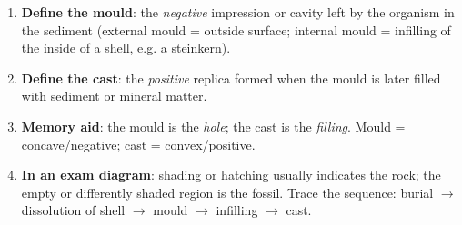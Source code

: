 \documentclass[11pt]{article}
\begin{document}
\begin{methode}
\begin{enumerate}
\item \textbf{Define the mould}: the \emph{negative} impression or cavity left by the organism in the sediment (external mould = outside surface; internal mould = infilling of the inside of a shell, e.g. a steinkern).
\item \textbf{Define the cast}: the \emph{positive} replica formed when the mould is later filled with sediment or mineral matter.
\item \textbf{Memory aid}: the mould is the \emph{hole}; the cast is the \emph{filling}. Mould = concave/negative; cast = convex/positive.
\item \textbf{In an exam diagram}: shading or hatching usually indicates the rock; the empty or differently shaded region is the fossil. Trace the sequence: burial $\rightarrow$ dissolution of shell $\rightarrow$ mould $\rightarrow$ infilling $\rightarrow$ cast.
\end{enumerate}
\end{methode}
\end{document}
